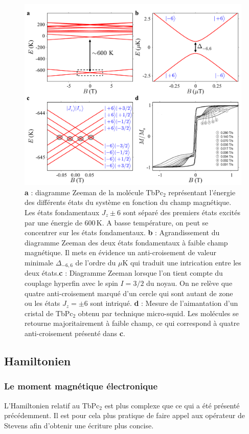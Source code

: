 \begin{figure}
\centering \includegraphics[scale=0.5]{Theorie/MagMol/figure4/figure4.pdf} 
\caption{\textbf{a} : diagramme Zeeman de la molécule TbPc$_2$ représentant l'énergie des différents états du système en fonction du champ magnétique. Les états fondamentaux $J_z \pm 6$ sont séparé des premiers états excités par une énergie de $600$\,K. A basse température, on peut se concentrer sur les états fondamentaux. \textbf{b} : Agrandissement du diagramme Zeeman des deux états fondamentaux à faible champ magnétique. Il mets en évidence un anti-croisement de valeur minimale $\Delta_{-6,6}$ de l'ordre du $\mu$K qui traduit une intrication entre les deux états.\textbf{c} : Diagramme Zeeman lorsque l'on tient compte du couplage hyperfin avec le spin $I=3/2$ du noyau. On ne relève que quatre anti-croisement marqué d'un cercle qui sont autant de zone ou les états $J_z =\pm6$ sont intriqué. \textbf{d} : Mesure de l'aimantation d'un cristal de TbPc$_2$ obtenu par technique micro-squid. Les molécules se retourne majoritairement à faible champ, ce qui correspond à quatre anti-croisement présenté dans \textbf{c}.}
\label{TbPc2Zeeman}
\end{figure}

\subsection{Hamiltonien}

\subsubsection{Le moment magnétique électronique}
L'Hamiltonien relatif au TbPc$_2$ est plus complexe que ce qui a été présenté précédemment. Il est pour cela plus pratique de faire appel aux opérateur de Stevens afin d'obtenir une écriture plus concise.

